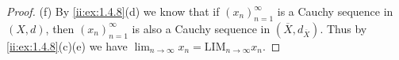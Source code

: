 \begin{proof}{(f)}
  By \cref{ii:ex:1.4.8}(d) we know that if \((x_n)_{n = 1}^\infty\) is a Cauchy sequence in \((X, d)\), then \((x_n)_{n = 1}^\infty\) is also a Cauchy sequence in \((\overline{X}, d_{\overline{X}})\).
  Thus by \cref{ii:ex:1.4.8}(c)(e) we have \(\lim_{n \to \infty} x_n = \text{LIM}_{n \to \infty} x_n\).
\end{proof}
